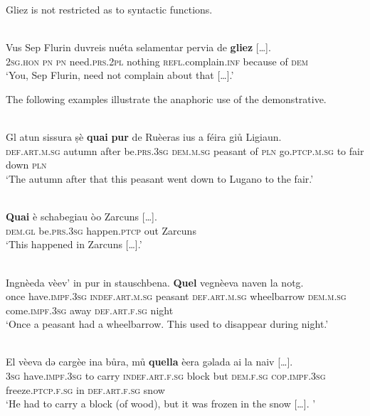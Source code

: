 {Gliez is not restricted as to syntactic functions.

\ea\label{}
\\
\gll Vus Sep Flurin duvreis nuéta selamentar pervia de \textbf{gliez} […].\\
    \textsc{2sg.hon} \textsc{pn} \textsc{pn} need.\textsc{prs.2pl} nothing \textsc{refl.}complain.\textsc{inf} because of \textsc{dem} \\
\glt `You, Sep Flurin, need not complain about that […].'
\z


The following examples illustrate the anaphoric use of the demonstrative. %

\ea\label{}
\\
\gll    Gl atun sissura ṣè \textbf{quai} \textbf{pur} de Ruèeras ius a féira giů Ligiaun.\\
     \textsc{def.art.m.sg} autumn after be.\textsc{prs.3sg} \textsc{dem.m.sg} peasant of \textsc{pln} go.\textsc{ptcp.m.sg} to fair down \textsc{pln}\\
\glt `The autumn after that this peasant went down to Lugano to the fair.'
\z

\ea\label{}
\\
\gll    \textbf{Quai} è  schabegiau òo Zarcuns […].\\
    \textsc{dem.gl} be.\textsc{prs.3sg}  happen.\textsc{ptcp} out Zarcuns\\
\glt `This happened in Zarcuns […].' 
\z

\ea\label{}
\\
\gll    Ingnèeda vèev’ in pur in stauschbena. \textbf{Quel} vegnèeva naven la notg.\\
     once have.\textsc{impf.3sg} \textsc{indef.art.m.sg} peasant \textsc{def.art.m.sg} wheelbarrow \textsc{dem.m.sg} come.\textsc{impf.3sg} away \textsc{def.art.f.sg} night\\
\glt `Once a peasant had a wheelbarrow. This used to disappear during night.'
\z

\ea\label{}
\\
\gll    El vèeva dǝ cargèe ina bůra, mů \textbf{quella} èera gǝlada ai la naiv […].\\
    \textsc{3sg} have.\textsc{impf.3sg} to carry \textsc{indef.art.f.sg} block but \textsc{dem.f.sg} \textsc{cop.impf.3sg} freeze.\textsc{ptcp.f.sg} in \textsc{def.art.f.sg} snow\\
\glt `He had to carry a block (of wood), but it was frozen in the snow […]. '
\z

}
